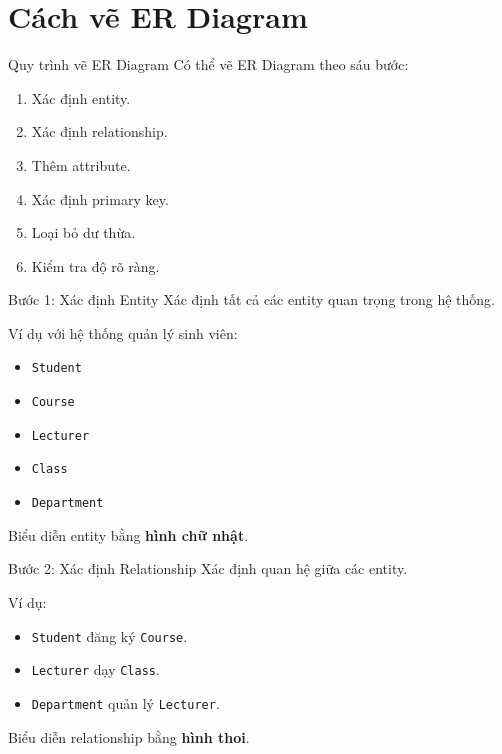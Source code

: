 \documentclass[aspectratio=169,11pt]{beamer}
\newcommand{\keyword}[1]{\textcolor{accent}{\textbf{#1}}}
\newcommand{\kw}[1]{\keyword{#1}}
\newcommand{\smallitem}{\setlength{\itemsep}{2pt}\setlength{\parskip}{0pt}}
\begin{document}
\section{Cách vẽ ER Diagram}

\begin{frame}{Quy trình vẽ ER Diagram}
\small
Có thể vẽ ER Diagram theo sáu bước:
\begin{enumerate}
\smallitem
  \item Xác định entity.
  \item Xác định relationship.
  \item Thêm attribute.
  \item Xác định primary key.
  \item Loại bỏ dư thừa.
  \item Kiểm tra độ rõ ràng.
\end{enumerate}
\end{frame}

\begin{frame}{Bước 1: Xác định Entity}
\small
Xác định tất cả các entity quan trọng trong hệ thống.

\vspace{2mm}
Ví dụ với hệ thống quản lý sinh viên:
\begin{itemize}
\smallitem
  \item \texttt{Student}
  \item \texttt{Course}
  \item \texttt{Lecturer}
  \item \texttt{Class}
  \item \texttt{Department}
\end{itemize}

Biểu diễn entity bằng \kw{hình chữ nhật}.
\end{frame}

\begin{frame}{Bước 2: Xác định Relationship}
\small
Xác định quan hệ giữa các entity.

\vspace{2mm}
Ví dụ:
\begin{itemize}
\smallitem
  \item \texttt{Student} đăng ký \texttt{Course}.
  \item \texttt{Lecturer} dạy \texttt{Class}.
  \item \texttt{Department} quản lý \texttt{Lecturer}.
\end{itemize}

Biểu diễn relationship bằng \kw{hình thoi}.
\end{frame}
\end{document}
